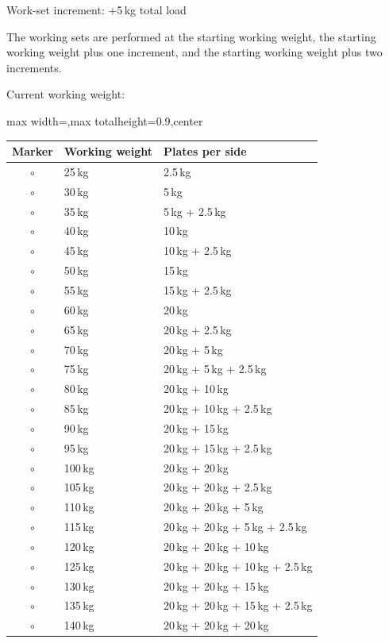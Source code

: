 \documentclass[11pt,a4paper]{article}
\newcommand{\tablearraystretch}{1.15}
\begin{document}
Work-set increment: +5\,kg total load

The working sets are performed at the starting working weight, the starting working weight plus one increment, and the starting working weight plus two increments.

Current working weight:

\begin{center}
\renewcommand{\arraystretch}{\tablearraystretch}
\begin{adjustbox}{max width=\linewidth,max totalheight=0.9\textheight,center}
\begin{tabular}{cll}
\toprule
Marker & Working weight & Plates per side \\
\midrule
$\circ$ & 25\,kg  & 2.5\,kg \\
$\circ$ & 30\,kg  & 5\,kg \\
$\circ$ & 35\,kg  & 5\,kg + 2.5\,kg \\
$\circ$ & 40\,kg  & 10\,kg \\
$\circ$ & 45\,kg  & 10\,kg + 2.5\,kg \\
$\circ$ & 50\,kg  & 15\,kg \\
$\circ$ & 55\,kg  & 15\,kg + 2.5\,kg \\
$\circ$ & 60\,kg  & 20\,kg \\
$\circ$ & 65\,kg  & 20\,kg + 2.5\,kg \\
$\circ$ & 70\,kg  & 20\,kg + 5\,kg \\
$\circ$ & 75\,kg  & 20\,kg + 5\,kg + 2.5\,kg \\
$\circ$ & 80\,kg  & 20\,kg + 10\,kg \\
$\circ$ & 85\,kg  & 20\,kg + 10\,kg + 2.5\,kg \\
$\circ$ & 90\,kg  & 20\,kg + 15\,kg \\
$\circ$ & 95\,kg  & 20\,kg + 15\,kg + 2.5\,kg \\
$\circ$ & 100\,kg & 20\,kg + 20\,kg \\
$\circ$ & 105\,kg & 20\,kg + 20\,kg + 2.5\,kg \\
$\circ$ & 110\,kg & 20\,kg + 20\,kg + 5\,kg \\
$\circ$ & 115\,kg & 20\,kg + 20\,kg + 5\,kg + 2.5\,kg \\
$\circ$ & 120\,kg & 20\,kg + 20\,kg + 10\,kg \\
$\circ$ & 125\,kg & 20\,kg + 20\,kg + 10\,kg + 2.5\,kg \\
$\circ$ & 130\,kg & 20\,kg + 20\,kg + 15\,kg \\
$\circ$ & 135\,kg & 20\,kg + 20\,kg + 15\,kg + 2.5\,kg \\
$\circ$ & 140\,kg & 20\,kg + 20\,kg + 20\,kg \\
\bottomrule
\end{tabular}
\end{adjustbox}
\renewcommand{\arraystretch}{1}
\end{center}
\end{document}
